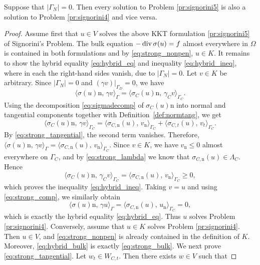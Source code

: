 \begin{proposition}
	Suppose that $|\Gamma_N|= 0$. Then every solution to Problem \ref{pr:signorini5} is also a solution to Problem \ref{pr:signorini4} and vice versa.
\end{proposition}
\begin{proof}
	Assume first that $u\in V$ solves the above KKT formulation \ref{pr:signorini5} of Signorini's Problem. The bulk equation $-\diver\sigma(u) = f$ almost everywhere in $\Omega$ is contained in both formulations and by \eqref{eq:strong_nonpen}, $u\in K$. It remains to show the hybrid equality \eqref{eq:hybrid_eq} and inequality \eqref{eq:hybrid_ineq}, where in each the right-hand sides vanish, due to $|\Gamma_N| = 0$. Let $v\in K$ be arbitrary. Since $|\Gamma_N| = 0$ and $(\gamma v)|_{\Gamma_D} = 0$, we have
	\begin{equation*}
		\langle \sigma(u)\mathrm n,\,\gamma v\rangle_\Gamma = \langle \sigma_C(u)\mathrm n,\,\gamma_C v\rangle_{\Gamma_C}.
	\end{equation*}
	Using the decomposition \eqref{eq:sigmadecomp} of $\sigma_C(u)\mathrm{n}$ into normal and tangential components together with Definition~\ref{def:normtang}, we get
	\begin{equation*}
		\langle \sigma_C(u)\mathrm n,\,\gamma v\rangle_{\Gamma_C} = \langle \sigma_{C,\mathrm n}(u),\,v_\mathrm n\rangle_{\Gamma_C} + \langle \sigma_{C,t}(u),\,v_t\rangle_{\Gamma_C}.
	\end{equation*}
	By \eqref{eq:strong_tangential}, the second term vanishes. Therefore, $\langle \sigma(u)\mathrm n,\,\gamma v\rangle_\Gamma=\langle \sigma_{C,\mathrm{n}}(u),\,v_\mathrm n\rangle_{\Gamma_C}$. Since $v\in K$, we have $v_\mathrm{n}\le 0$ almost everywhere on $\Gamma_C$, and by \eqref{eq:strong_lambda} we know that $\sigma_{C,\mathrm{n}}(u)\in\Lambda_C$. Hence
	\begin{equation*}
		\langle \sigma_C(u)\mathrm n,\,\gamma_C v\rangle_{\Gamma_C}=\langle \sigma_{C,\mathrm{n}}(u),\,v_\mathrm n\rangle_{\Gamma_C}\ge 0,
	\end{equation*}
	which proves the inequality \eqref{eq:hybrid_ineq}. Taking $v=u$ and using \eqref{eq:strong_comp}, we similarly obtain
	\begin{equation*}
		\langle \sigma(u)\mathrm n,\,\gamma u\rangle_\Gamma
		=
		\langle \sigma_{C,\mathrm{n}}(u),\,u_\mathrm n\rangle_{\Gamma_C}
		=0,
	\end{equation*}
	which is exactly the hybrid equality \eqref{eq:hybrid_eq}. Thus $u$ solves Problem \ref{pr:signorini4}. Conversely, assume that $u\in K$ solves Problem \ref{pr:signorini4}. Then $u\in V$, and \eqref{eq:strong_nonpen} is already contained in the definition of $K$. Moreover, \eqref{eq:hybrid_bulk} is exactly \eqref{eq:strong_bulk}. We next prove \eqref{eq:strong_tangential}. Let $w_t\in W_{C,t}$. Then there exists $w\in V$ such that

\end{proof}
